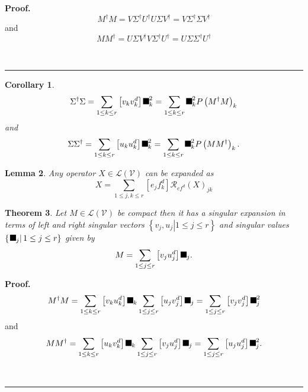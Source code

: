 \documentclass[aps,preprint]{revtex4}%
\providecommand{\U}[1]{\protect\rule{.1in}{.1in}}
\newtheorem{theorem}{Theorem}
\newtheorem{corollary}[theorem]{Corollary}
\newtheorem{lemma}[theorem]{Lemma}
\newenvironment{proof}[1][Proof]{\noindent\textbf{#1.} }{\ \rule{0.5em}{0.5em}}
\begin{document}
\begin{proof}%
\begin{equation}
M^{\dagger}M=V\Sigma^{\dagger}U^{\dagger}U\Sigma V^{\dagger}=V\Sigma^{\dagger
}\Sigma V^{\dagger}%
\end{equation}
and
\begin{equation}
MM^{\dagger}=U\Sigma V^{\dagger}V\Sigma^{\dagger}U^{\dagger}=U\Sigma
\Sigma^{\dagger}U^{\dagger}%
\end{equation}

\end{proof}

\begin{corollary}%
\begin{equation}
\Sigma^{\dagger}\Sigma=\sum_{1\leq k\leq r}\left[  v_{k}v_{k}^{d}\right]
\U{3c3} _{k}^{2}=\sum_{1\leq k\leq r}\U{3c3} _{k}^{2}P\left(  M^{\dagger
}M\right)  _{k}%
\end{equation}
and
\begin{equation}
\Sigma\Sigma^{\dagger}=\sum_{1\leq k\leq r}\left[  u_{k}u_{k}^{d}\right]
\U{3c3} _{k}^{2}=\sum_{1\leq k\leq r}\U{3c3} _{k}^{2}P\left(  MM^{\dagger
}\right)  _{k}.
\end{equation}

\end{corollary}

\begin{lemma}
Any operator $X\in\mathcal{L}\left(  \mathcal{V}\right)  $ can be expanded as
\begin{equation}
X=\sum_{1\leq j,k\leq r}\left[  e_{j}f_{k}^{d}\right]  \mathcal{R}_{ef^{d}%
}\left(  X\right)  _{jk}%
\end{equation}

\end{lemma}

\begin{theorem}
Let $M\in\mathcal{L}\left(  \mathcal{V}\right)  $ be compact then it has a
\emph{singular expansion} in terms of left and right singular vectors
$\left\{  \left.  v_{j},u_{j}\right\vert 1\leq j\leq r\right\}  $ and singular
values $\left\{  \left.  \U{3c3} _{j}\right\vert 1\leq j\leq r\right\}  $
given by
\begin{equation}
M=\sum_{1\leq j\leq r}\left[  v_{j}u_{j}^{d}\right]  \U{3c3} _{j}.
\end{equation}

\end{theorem}

\begin{proof}%
\begin{equation}
M^{\dagger}M=\sum_{1\leq k\leq r}\left[  v_{k}u_{k}^{d}\right]  \U{3c3}
_{k}\sum_{1\leq j\leq r}\left[  u_{j}v_{j}^{d}\right]  \U{3c3} _{j}%
=\sum_{1\leq j\leq r}\left[  v_{j}v_{j}^{d}\right]  \U{3c3} _{j}^{2}%
\end{equation}
and
\begin{equation}
MM^{\dagger}=\sum_{1\leq k\leq r}\left[  u_{k}v_{k}^{d}\right]  \U{3c3}
_{k}\sum_{1\leq j\leq r}\left[  v_{j}u_{j}^{d}\right]  \U{3c3} _{j}%
=\sum_{1\leq j\leq r}\left[  u_{j}u_{j}^{d}\right]  \U{3c3} _{j}^{2}.
\end{equation}

\end{proof}
\end{document}
